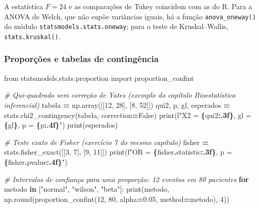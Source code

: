 \documentclass[
]{book}
\newenvironment{Shaded}{\begin{snugshade}}{\end{snugshade}}
\newcommand{\BuiltInTok}[1]{#1}
\newcommand{\CommentTok}[1]{\textcolor[rgb]{0.56,0.35,0.01}{\textit{#1}}}
\newcommand{\ControlFlowTok}[1]{\textcolor[rgb]{0.13,0.29,0.53}{\textbf{#1}}}
\newcommand{\DecValTok}[1]{\textcolor[rgb]{0.00,0.00,0.81}{#1}}
\newcommand{\FloatTok}[1]{\textcolor[rgb]{0.00,0.00,0.81}{#1}}
\newcommand{\ImportTok}[1]{#1}
\newcommand{\KeywordTok}[1]{\textcolor[rgb]{0.13,0.29,0.53}{\textbf{#1}}}
\newcommand{\NormalTok}[1]{#1}
\newcommand{\OperatorTok}[1]{\textcolor[rgb]{0.81,0.36,0.00}{\textbf{#1}}}
\newcommand{\SpecialCharTok}[1]{\textcolor[rgb]{0.81,0.36,0.00}{\textbf{#1}}}
\newcommand{\SpecialStringTok}[1]{\textcolor[rgb]{0.31,0.60,0.02}{#1}}
\newcommand{\StringTok}[1]{\textcolor[rgb]{0.31,0.60,0.02}{#1}}
\newcommand{\VariableTok}[1]{\textcolor[rgb]{0.00,0.00,0.00}{#1}}
\begin{document}
A estatística \(F = 24\) e as comparações de Tukey coincidem com as do R. Para a ANOVA de Welch, que não supõe variâncias iguais, há a função \texttt{anova\_oneway()} do módulo \texttt{statsmodels.stats.oneway}; para o teste de Kruskal--Wallis, \texttt{stats.kruskal()}.

\subsubsection{Proporções e tabelas de contingência}\label{proporuxe7uxf5es-e-tabelas-de-continguxeancia}

\begin{Shaded}
\begin{Highlighting}[]
\ImportTok{from}\NormalTok{ statsmodels.stats.proportion }\ImportTok{import}\NormalTok{ proportion\_confint}

\CommentTok{\# Qui{-}quadrado sem correção de Yates (exemplo do capítulo Bioestatística inferencial)}
\NormalTok{tabela }\OperatorTok{=}\NormalTok{ np.array([[}\DecValTok{12}\NormalTok{, }\DecValTok{28}\NormalTok{], [}\DecValTok{8}\NormalTok{, }\DecValTok{52}\NormalTok{]])}
\NormalTok{qui2, p, gl, esperados }\OperatorTok{=}\NormalTok{ stats.chi2\_contingency(tabela, correction}\OperatorTok{=}\VariableTok{False}\NormalTok{)}
\BuiltInTok{print}\NormalTok{(}\SpecialStringTok{f"X2 = }\SpecialCharTok{\{}\NormalTok{qui2}\SpecialCharTok{:.3f\}}\SpecialStringTok{, gl = }\SpecialCharTok{\{}\NormalTok{gl}\SpecialCharTok{\}}\SpecialStringTok{, p = }\SpecialCharTok{\{}\NormalTok{p}\SpecialCharTok{:.4f\}}\SpecialStringTok{"}\NormalTok{)}
\BuiltInTok{print}\NormalTok{(esperados)}

\CommentTok{\# Teste exato de Fisher (exercício 7 do mesmo capítulo)}
\NormalTok{fisher }\OperatorTok{=}\NormalTok{ stats.fisher\_exact([[}\DecValTok{3}\NormalTok{, }\DecValTok{7}\NormalTok{], [}\DecValTok{9}\NormalTok{, }\DecValTok{11}\NormalTok{]])}
\BuiltInTok{print}\NormalTok{(}\SpecialStringTok{f"OR = }\SpecialCharTok{\{}\NormalTok{fisher}\SpecialCharTok{.}\NormalTok{statistic}\SpecialCharTok{:.3f\}}\SpecialStringTok{, p = }\SpecialCharTok{\{}\NormalTok{fisher}\SpecialCharTok{.}\NormalTok{pvalue}\SpecialCharTok{:.4f\}}\SpecialStringTok{"}\NormalTok{)}

\CommentTok{\# Intervalos de confiança para uma proporção: 12 eventos em 80 pacientes}
\ControlFlowTok{for}\NormalTok{ metodo }\KeywordTok{in}\NormalTok{ [}\StringTok{"normal"}\NormalTok{, }\StringTok{"wilson"}\NormalTok{, }\StringTok{"beta"}\NormalTok{]:}
    \BuiltInTok{print}\NormalTok{(metodo, np.}\BuiltInTok{round}\NormalTok{(proportion\_confint(}\DecValTok{12}\NormalTok{, }\DecValTok{80}\NormalTok{, alpha}\OperatorTok{=}\FloatTok{0.05}\NormalTok{, method}\OperatorTok{=}\NormalTok{metodo), }\DecValTok{4}\NormalTok{))}
\end{Highlighting}
\end{Shaded}
\end{document}
